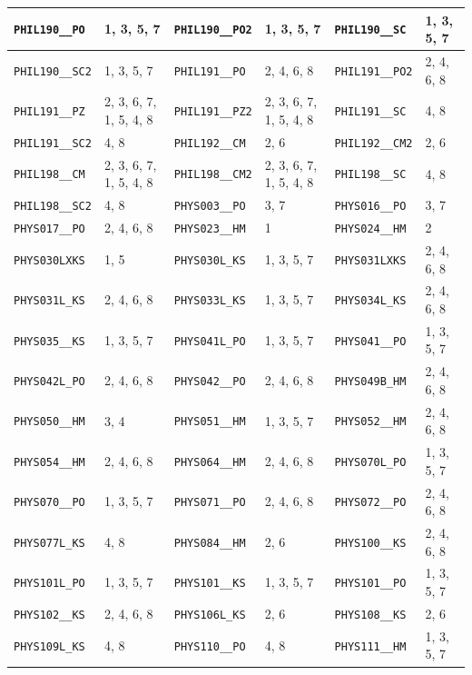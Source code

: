 \begin{longtable}{|l|l||l|l||l|l|}
    \verb|PHIL190__PO| & 1, 3, 5, 7 & \verb|PHIL190__PO2| & 1, 3, 5, 7 & \verb|PHIL190__SC| & 1, 3, 5, 7\\\hline
    \verb|PHIL190__SC2| & 1, 3, 5, 7 & \verb|PHIL191__PO| & 2, 4, 6, 8 & \verb|PHIL191__PO2| & 2, 4, 6, 8\\\hline
    \verb|PHIL191__PZ| & 2, 3, 6, 7, 1, 5, 4, 8 & \verb|PHIL191__PZ2| & 2, 3, 6, 7, 1, 5, 4, 8 & \verb|PHIL191__SC| & 4, 8\\\hline
    \verb|PHIL191__SC2| & 4, 8 & \verb|PHIL192__CM| & 2, 6 & \verb|PHIL192__CM2| & 2, 6\\\hline
    \verb|PHIL198__CM| & 2, 3, 6, 7, 1, 5, 4, 8 & \verb|PHIL198__CM2| & 2, 3, 6, 7, 1, 5, 4, 8 & \verb|PHIL198__SC| & 4, 8\\\hline
    \verb|PHIL198__SC2| & 4, 8 & \verb|PHYS003__PO| & 3, 7 & \verb|PHYS016__PO| & 3, 7\\\hline
    \verb|PHYS017__PO| & 2, 4, 6, 8 & \verb|PHYS023__HM| & 1 & \verb|PHYS024__HM| & 2\\\hline
    \verb|PHYS030LXKS| & 1, 5 & \verb|PHYS030L_KS| & 1, 3, 5, 7 & \verb|PHYS031LXKS| & 2, 4, 6, 8\\\hline
    \verb|PHYS031L_KS| & 2, 4, 6, 8 & \verb|PHYS033L_KS| & 1, 3, 5, 7 & \verb|PHYS034L_KS| & 2, 4, 6, 8\\\hline
    \verb|PHYS035__KS| & 1, 3, 5, 7 & \verb|PHYS041L_PO| & 1, 3, 5, 7 & \verb|PHYS041__PO| & 1, 3, 5, 7\\\hline
    \verb|PHYS042L_PO| & 2, 4, 6, 8 & \verb|PHYS042__PO| & 2, 4, 6, 8 & \verb|PHYS049B_HM| & 2, 4, 6, 8\\\hline
    \verb|PHYS050__HM| & 3, 4 & \verb|PHYS051__HM| & 1, 3, 5, 7 & \verb|PHYS052__HM| & 2, 4, 6, 8\\\hline
    \verb|PHYS054__HM| & 2, 4, 6, 8 & \verb|PHYS064__HM| & 2, 4, 6, 8 & \verb|PHYS070L_PO| & 1, 3, 5, 7\\\hline
    \verb|PHYS070__PO| & 1, 3, 5, 7 & \verb|PHYS071__PO| & 2, 4, 6, 8 & \verb|PHYS072__PO| & 2, 4, 6, 8\\\hline
    \verb|PHYS077L_KS| & 4, 8 & \verb|PHYS084__HM| & 2, 6 & \verb|PHYS100__KS| & 2, 4, 6, 8\\\hline
    \verb|PHYS101L_PO| & 1, 3, 5, 7 & \verb|PHYS101__KS| & 1, 3, 5, 7 & \verb|PHYS101__PO| & 1, 3, 5, 7\\\hline
    \verb|PHYS102__KS| & 2, 4, 6, 8 & \verb|PHYS106L_KS| & 2, 6 & \verb|PHYS108__KS| & 2, 6\\\hline
    \verb|PHYS109L_KS| & 4, 8 & \verb|PHYS110__PO| & 4, 8 & \verb|PHYS111__HM| & 1, 3, 5, 7\\\hline

\end{longtable}
